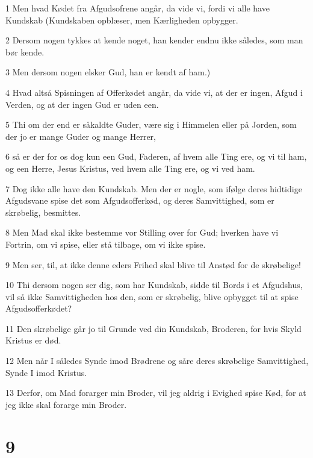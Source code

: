 \par 1 Men hvad Kødet fra Afgudsofrene angår, da vide vi, fordi vi alle have Kundskab (Kundskaben opblæser, men Kærligheden opbygger.
\par 2 Dersom nogen tykkes at kende noget, han kender endnu ikke således, som man bør kende.
\par 3 Men dersom nogen elsker Gud, han er kendt af ham.)
\par 4 Hvad altså Spisningen af Offerkødet angår, da vide vi, at der er ingen, Afgud i Verden, og at der ingen Gud er uden een.
\par 5 Thi om der end er såkaldte Guder, være sig i Himmelen eller på Jorden, som der jo er mange Guder og mange Herrer,
\par 6 så er der for os dog kun een Gud, Faderen, af hvem alle Ting ere, og vi til ham, og een Herre, Jesus Kristus, ved hvem alle Ting ere, og vi ved ham.
\par 7 Dog ikke alle have den Kundskab. Men der er nogle, som ifølge deres hidtidige Afgudsvane spise det som Afgudsofferkød, og deres Samvittighed, som er skrøbelig, besmittes.
\par 8 Men Mad skal ikke bestemme vor Stilling over for Gud; hverken have vi Fortrin, om vi spise, eller stå tilbage, om vi ikke spise.
\par 9 Men ser, til, at ikke denne eders Frihed skal blive til Anstød for de skrøbelige!
\par 10 Thi dersom nogen ser dig, som har Kundskab, sidde til Bords i et Afgudshus, vil så ikke Samvittigheden hos den, som er skrøbelig, blive opbygget til at spise Afgudsofferkødet?
\par 11 Den skrøbelige går jo til Grunde ved din Kundskab, Broderen, for hvis Skyld Kristus er død.
\par 12 Men når I således Synde imod Brødrene og såre deres skrøbelige Samvittighed, Synde I imod Kristus.
\par 13 Derfor, om Mad forarger min Broder, vil jeg aldrig i Evighed spise Kød, for at jeg ikke skal forarge min Broder.

\chapter{9}


